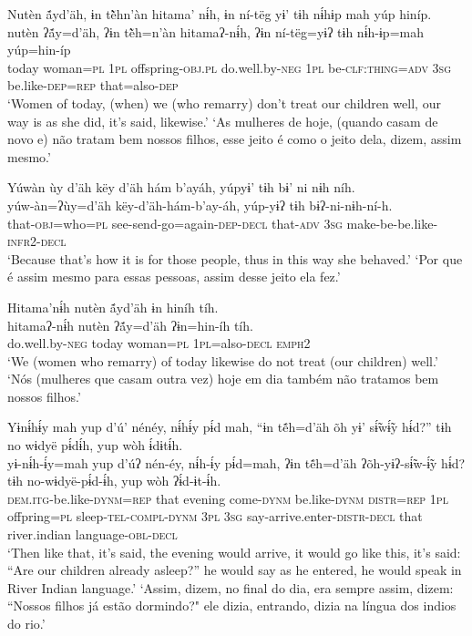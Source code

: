 \documentclass[output=paper,
modfonts,nonflat
]{langsci/langscibook}
\begin{document}
\ea  Nutèn ã́yd’äh, ɨn tè̃̀hn’àn hitama’ nɨ́h, ɨn ní-tëg yɨ’ tɨh nɨ́hɨp mah yúp hiníp.\\ 
\gll nutèn ʔã́y=d’äh, ʔɨn tè̃̀h=n’àn hitamaʔ-nɨ́h, ʔɨn ní-tëg=yɨʔ tɨh nɨ́h-ɨp=mah yúp=hin-íp\\
     today woman\textsc{=pl} \textsc{1pl} offspring\textsc{-obj.pl} do.well.by\textsc{-neg} \textsc{1pl} be\textsc{-clf}:\textsc{thing=adv} \textsc{3sg} be.like\textsc{-dep=rep} that=also\textsc{-dep}\\
\glt ‘Women of today, (when) we (who remarry) don’t treat our children well, our way is as she did, it’s said, likewise.'
\glt ‘As mulheres de hoje, (quando casam de novo e) não tratam bem nossos filhos, esse jeito é como o jeito dela, dizem, assim mesmo.'
\z 

\ea  Yúwàn ùy d’äh këy d’äh hám b’ayáh, yúpyɨ' tɨh bɨ’ ni nɨh níh.\\  
\gll yúw-àn=ʔùy=d’äh këy-d’äh-hám-b’ay-áh, yúp-yɨʔ tɨh bɨʔ-ni-nɨh-ní-h.\\ 
	that\textsc{-obj}=who=\textsc{pl} see-send-go=again\textsc{-dep-decl} that\textsc{-adv} \textsc{3sg} make-be-be.like\textsc{-infr2-decl}\\
\glt ‘Because that's how it is for those people, thus in this way she behaved.' 
\glt ‘Por que é assim mesmo para essas pessoas, assim desse jeito ela fez.'
\z 

\newpage
\ea  Hitama’nɨ́h nutèn ã́yd’äh ɨn hiníh tíh.\\ 
\gll hitamaʔ-nɨ́h nutèn ʔã́y=d’äh ʔɨn=hin-íh tíh.\\
     do.well.by\textsc{-neg} today woman\textsc{=pl} \textsc{1pl=}also\textsc{-decl} \textsc{emph2}\\
\glt ‘We (women who remarry) of today likewise do not treat (our children) well.'
\glt ‘Nós (mulheres que casam outra vez) hoje em dia também não tratamos bem nossos filhos.'
\z 

\ea  Yɨnɨ́hɨ́y mah yup d’ú’ nénéy, nɨ́hɨ́y pɨ́d mah, “ɨn tẽ́h=d’äh õh yɨ’ sɨ̃́wɨ̃́y hɨ́d?” tɨh no wɨdyë pɨ́dɨ́h, yup wòh ɨ́dɨtɨ́h.\\ 
\gll yɨ-nɨ́h-ɨ́y=mah yup d’úʔ nén-éy, nɨ́h-ɨ́y pɨ́d=mah, ʔɨn tẽ́h=d’äh ʔõh-yɨʔ-sɨ̃́w-ɨ̃́y hɨ́d? tɨh no-wɨdyë-pɨ́d-ɨ́h, yup wòh ʔɨ́d-ɨt-ɨ́h.\\
     \textsc{dem.itg-}be.like\textsc{-dynm=rep} that evening come\textsc{-dynm} be.like\textsc{-dynm} \textsc{distr=rep} \textsc{1pl} offpring\textsc{=pl} sleep\textsc{-tel-compl-dynm} \textsc{3pl} \textsc{3sg} say-arrive.enter\textsc{-distr-decl} that river.indian language\textsc{-obl-decl}\\
\glt ‘Then like that, it’s said, the evening would arrive, it would go like this, it’s said: “Are our children already asleep?” he would say as he entered, he would speak in River Indian language.'{\footnotemark}
\glt ‘Assim, dizem, no final do dia, era sempre assim, dizem: “Nossos filhos já estão dormindo?" ele dizia, entrando, dizia na língua dos indios do rio.'
\z 
\end{document}
